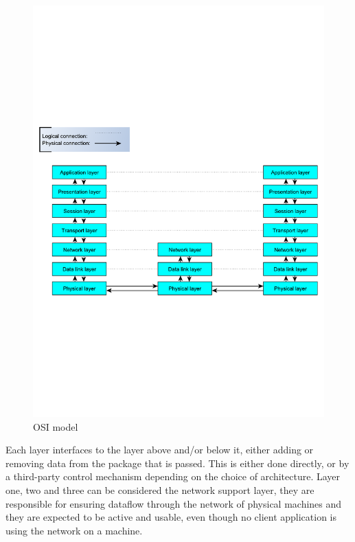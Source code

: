 \begin{figure}[htb]
	\begin{center}
	\includegraphics[scale=0.5,trim=0 0 0 0]{content/graphics/OsiStack.pdf} %
	\caption{OSI model}
	\label{fig:osi_model_stack}			%
	\end{center}
\end{figure}






Each layer interfaces to the layer above and/or below it, either adding or removing data from the package that is passed. This is either done directly, or by a third-party control mechanism depending on the choice of architecture.
Layer one, two and three can be considered the network support layer, they are responsible for ensuring dataflow through the network of physical machines and they are expected to be active and usable, even though no client application is using the network on a machine.

